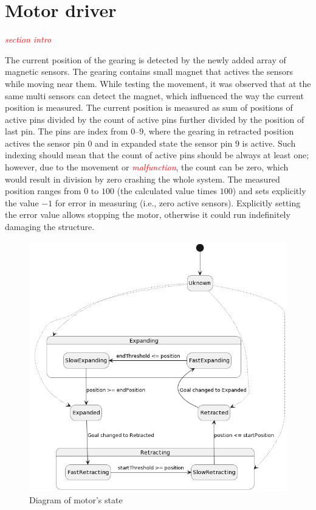 \documentclass[
  digital,     %
  oneside,     %
  nosansbold,  %
  nocolorbold, %
  lof,         %
  lot,         %
]{fithesis4}
\newcommand{\TODO}[1]{\textcolor{red}{\textit{#1}}}
\begin{document}
{{{\section{ Motor driver }

\TODO{section intro}

The current position of the gearing is detected by the newly added array of magnetic sensors. The gearing contains small magnet that actives the sensors while moving near them. While testing the movement, it was observed that at the same multi sensors can detect the magnet, which influenced the way the current position is measured. The current position is measured as sum of positions of active pins divided by the count of active pins further divided by the position of last pin. The pins are index from $\numrange{0}{9}$, where the gearing in retracted position actives the sensor pin $0$ and in expanded state the sensor pin $9$ is active. Such indexing should mean that the count of active pins should be always at least one; however, due to the movement or \TODO{malfunction}, the count can be zero, which would result in division by zero crashing the whole system. The measured position ranges from $0$ to $100$ (the calculated value times $100$) and sets explicitly the value $-1$ for error in measuring (i.e., zero active sensors). Explicitly setting the error value allows stopping the motor, otherwise it could run indefinitely damaging the structure. 

\begin{figure}
    \includegraphics[width=\textwidth,height=\textheight,keepaspectratio]{assets/motor-state-diagram-wip.png}
    \caption{Diagram of motor's state}
    \label{fig:motor-state}
\end{figure}

}}}
\end{document}
